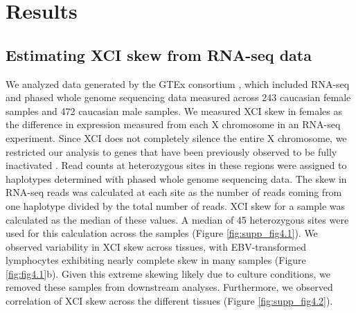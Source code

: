 \section{Results}

\subsection{Estimating XCI skew from RNA-seq data}

We analyzed data generated by the GTEx consortium \cite{GTEx_Consortium2020-xx}, which included RNA-seq and phased whole genome sequencing data measured across 243 caucasian female samples and 472 caucasian male samples. We measured XCI skew in females as the difference in expression measured from each X chromosome in an RNA-seq experiment. Since XCI does not completely silence the entire X chromosome, we restricted our analysis to genes that have been previously observed to be fully inactivated \cite{Carrel2005-zm,Cotton2013-jl,Tukiainen2017-xm}. Read counts at heterozygous sites in these regions were assigned to haplotypes determined with phased whole genome sequencing data. The skew in RNA-seq reads was calculated at each site as the number of reads coming from one haplotype divided by the total number of reads. XCI skew for a sample was calculated as the median of these values. A median of 45 heterozygous sites were used for this calculation across the samples (Figure \ref{fig:supp_fig4.1}). We observed variability in XCI skew across tissues, with EBV-transformed lymphocytes exhibiting nearly complete skew in many samples (Figure \ref{fig:fig4.1}b).  Given this extreme skewing likely due to culture conditions, we removed these samples from downstream analyses. Furthermore, we observed correlation of XCI skew across the different tissues (Figure \ref{fig:supp_fig4.2}).




